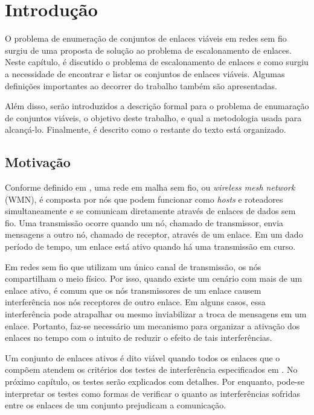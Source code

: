 \chapter{Introdução}
\label{cap:introducao}

O problema de enumeração de conjuntos de enlaces viáveis em redes sem fio surgiu de uma proposta de solução ao problema de escalonamento de enlaces. Neste capítulo, é discutido o problema de escalonamento de enlaces e como surgiu a necessidade de encontrar e listar os conjuntos de enlaces viáveis. Algumas definições importantes ao decorrer do trabalho também são apresentadas. 

Além disso, serão introduzidos a descrição formal para o problema de enumaração de conjuntos viáveis, o objetivo deste trabalho, e qual a metodologia usada para alcançá-lo. Finalmente, é descrito como o restante do texto está organizado.

\section{Motivação}

Conforme definido em \cite{mesh}, uma rede em malha sem fio, ou {\it wireless mesh network} (WMN), é composta por nós que podem funcionar como {\it hosts} e roteadores simultaneamente e se comunicam diretamente através de enlaces de dados sem fio. Uma transmissão ocorre quando um nó, chamado de transmissor, envia mensagens a outro nó, chamado de receptor, através de um enlace. Em um dado período de tempo, um enlace está ativo quando há uma transmissão em curso.

Em redes sem fio que utilizam um único canal de transmissão, os nós compartilham o meio físico. Por isso, quando existe um cenário com mais de um enlace ativo, é comum que os nós transmissores de um enlace causem interferência nos nós receptores de outro enlace. Em alguns casos, essa interferência pode atrapalhar ou mesmo inviabilizar a troca de mensagens em um enlace. Portanto, faz-se necessário um mecanismo para organizar a ativação dos enlaces no tempo com o intuito de reduzir o efeito de tais interferências.

Um conjunto de enlaces ativos é dito viável quando todos os enlaces que o compõem atendem os critérios dos testes de interferência especificados em \cite{primary, sinr}. No próximo capítulo, os testes serão explicados com detalhes. Por enquanto, pode-se interpretar os testes como formas de verificar o quanto as interferências sofridas entre os enlaces de um conjunto prejudicam a comunicação.

